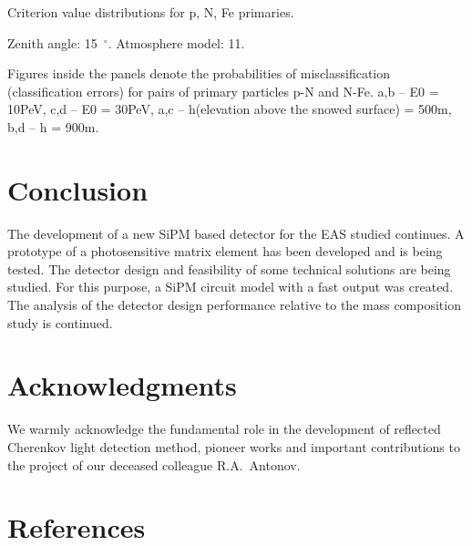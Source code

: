\documentclass[a4paper]{jpconf}
\begin{document}
Criterion value distributions for p, N, Fe primaries. 

Zenith angle: 15~$^\circ$. 
Atmosphere model: 11. 

Figures inside the panels denote the probabilities of misclassification (classification errors) for pairs of primary particles p-N and N-Fe.
a,b – E0 = 10PeV, 
c,d – E0 = 30PeV, 
a,c – h(elevation above the snowed surface) = 500m,
b,d – h = 900m.

\section{Conclusion}
The development of a new SiPM based detector for the EAS studied continues. A prototype of a photosensitive matrix element has been developed and is being tested. The detector design and feasibility of some technical solutions are being studied.  For this purpose, a SiPM circuit model with a fast output was created. The analysis of the detector design performance relative to the mass composition study is continued.

\section{Acknowledgments}
We warmly acknowledge the fundamental role in the development of reflected Cherenkov light detection method, pioneer works and important contributions to the project of our deceased colleague R.A.~Antonov.

\section{References}

\end{document}

